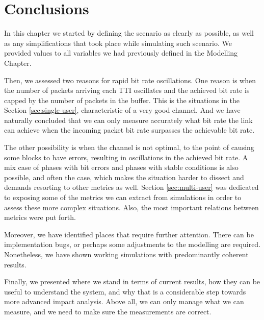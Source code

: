 \section*{Conclusions}

In this chapter we started by defining the scenario as clearly as possible, as well as any simplifications that took place while simulating such scenario. We provided values to all variables we had previously defined in the Modelling Chapter.

Then, we assessed two reasons for rapid bit rate oscillations. One reason is when the number of packets arriving each TTI oscillates and the achieved bit rate is capped by the number of packets in the buffer. This is the situations in the Section \ref{sec:single-user}, characteristic of a very good channel. And we have naturally concluded that we can only measure accurately what bit rate the link can achieve when the incoming packet bit rate surpasses the achievable bit rate.

The other possibility is when the channel is not optimal, to the point of causing some blocks to have errors, resulting in oscillations in the achieved bit rate. A mix case of phases with bit errors and phases with stable conditions is also possible, and often the case, which makes the situation harder to dissect and demands resorting to other metrics as well. Section \ref{sec:multi-user} was dedicated to exposing some of the metrics we can extract from simulations in order to assess these more complex situations. Also, the most important relations between metrics were put forth.

Moreover, we have identified places that require further attention. There can be implementation bugs, or perhaps some adjustments to the modelling are required. Nonetheless, we have shown working simulations with predominantly coherent results. 

Finally, we presented where we stand in terms of current results, how they can be useful to understand the system, and why that is a considerable step towards more advanced impact analysis. Above all, we can only manage what we can measure, and we need to make sure the measurements are correct.


